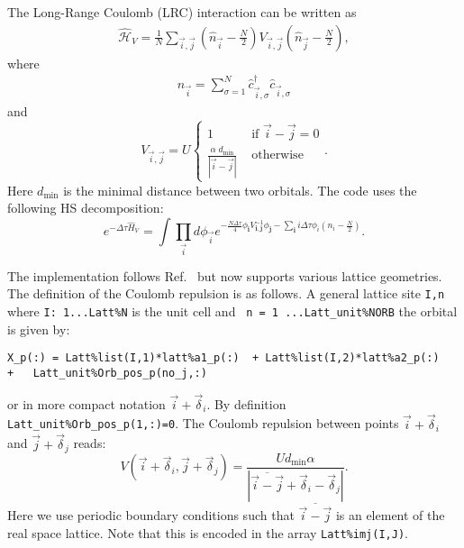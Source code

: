 The Long-Range Coulomb (LRC) interaction can be written as
\begin{align}
\hat{\mathcal{H}}_{V} =
\frac{1} { N } \sum_{\vec{i},\vec{j}}  \left(  \hat{n}_{\vec{i}} -  \frac{N}{2}  \right)  V_{\vec{i},\vec{j}} \left(  \hat{n}_{\vec{j}} -  \frac{N}{2}  \right), 
\end{align} 
where
\begin{align}
\hat{n}_{\vec{i}} = \sum_{\sigma=1}^{N}  \hat{c}^{\dagger}_{\vec{i},\sigma}  \hat{c}^{}_{\vec{i},\sigma}
\end{align} 
and
\begin{equation}
V_{\vec{i}, \vec{j}}   =   U \left\{
\begin{array}{ll}  
1          &   \text{ if } \vec{i} - \vec{j}    = 0 \\
\frac{\alpha   \;   d_\mathrm{min}}{ |   \vec{i} - \vec{j} | } &     \text{ otherwise }
\end{array}
\right. .
\end{equation}
Here $d_\mathrm{min}$ is the minimal distance between two orbitals.     The code uses the following  HS decomposition:
\begin{equation}
e^{-\Delta \tau \hat{H}_V }  =  \int \prod_{\vec{i}} d \phi_{\vec{i}}   e^{ - \frac{N \Delta \tau} {4} \phi_{\pmb{i}} V^{-1}_{\pmb{i},\pmb{j}}  \phi_{\pmb{j}} - \sum_{\pmb{i}}  i \Delta \tau \phi_i \left( n_{i} - \frac{N}{2} \right) }.
\end{equation}

The implementation follows Ref.~\cite{Hohenadler14}  but now supports various lattice geometries.    The definition of  the Coulomb repulsion is as follows. 
A general lattice site  \texttt{I,n}   where \texttt{I: 1...Latt\%N} is the unit cell and \texttt{ n = 1 ...Latt\_unit\%NORB}  the orbital  is given by: 
\begin{lstlisting}[style=fortran]
X_p(:) = Latt%list(I,1)*latt%a1_p(:)  + Latt%list(I,2)*latt%a2_p(:) 
+   Latt_unit%Orb_pos_p(no_j,:)
\end{lstlisting}
or in more compact notation $ \vec{i}  + \vec{\delta}_i $.   By definition \texttt{Latt\_unit\%Orb\_pos\_p(1,:)=0}.
The Coulomb repulsion between points   $ \vec{i}  + \vec{\delta}_i $   and $ \vec{j}  + \vec{\delta}_j $   reads: 
\begin{equation}
V(\vec{i}  + \vec{\delta}_i ,  \vec{j}  + \vec{\delta}_j  )  =  \frac{U d_\mathrm{min} \alpha}{  |  \overline{\vec{i} - \vec{j}} + \vec{\delta}_i - \vec{\delta}_j  |}.
\end{equation}
Here  we use periodic boundary conditions such that  $\overline{\vec{i} - \vec{j}}$  is an element of the real space lattice. Note that this is encoded in the array \texttt{Latt\%imj(I,J)}.

